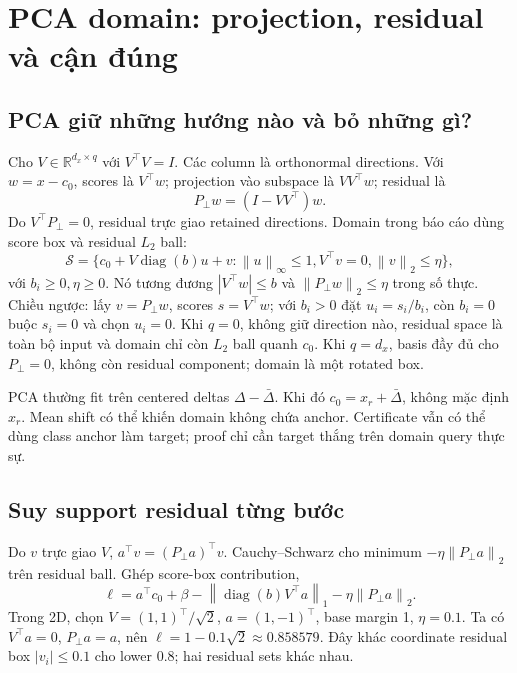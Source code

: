 \documentclass[11pt,a4paper]{article}
\newcommand{\R}{\mathbb R}
\newcommand{\norm}[1]{\left\lVert#1\right\rVert}
\newcommand{\diag}{\operatorname{diag}}
\newcommand{\Sset}{\mathcal S}
\theoremstyle{definition}
\begin{document}
\section{PCA domain: projection, residual và cận đúng}
\subsection{PCA giữ những hướng nào và bỏ những gì?}
Cho $V\in\R^{d_x\times q}$ với $V^\top V=I$. Các column là orthonormal
directions. Với $w=x-c_0$, scores là $V^\top w$; projection vào subspace
là $VV^\top w$; residual là
\begin{equation}
P_\perp w=(I-VV^\top)w.
\end{equation}
Do $V^\top P_\perp=0$, residual trực giao retained directions. Domain
trong báo cáo dùng score box và residual $L_2$ ball:
\begin{equation}
\Sset=\{c_0+V\diag(b)u+v:\norm{u}_\infty\le1,
V^\top v=0,\norm{v}_2\le\eta\},
\end{equation}
với $b_i\ge0,\eta\ge0$. Nó tương đương
$|V^\top w|\le b$ và $\norm{P_\perp w}_2\le\eta$ trong số thực. Chiều
ngược: lấy $v=P_\perp w$, scores $s=V^\top w$; với $b_i>0$ đặt
$u_i=s_i/b_i$, còn $b_i=0$ buộc $s_i=0$ và chọn $u_i=0$.
Khi $q=0$, không giữ direction nào, residual space là toàn bộ input và
domain chỉ còn $L_2$ ball quanh $c_0$. Khi $q=d_x$, basis đầy đủ cho
$P_\perp=0$, không còn residual component; domain là một rotated box.

PCA thường fit trên centered deltas $\Delta-\bar\Delta$. Khi đó
$c_0=x_r+\bar\Delta$, không mặc định $x_r$. Mean shift có thể khiến domain
không chứa anchor. Certificate vẫn có thể dùng class anchor làm target;
proof chỉ cần target thắng trên domain query thực sự.

\subsection{Suy support residual từng bước}
Do $v$ trực giao $V$, $a^\top v=(P_\perp a)^\top v$.
Cauchy--Schwarz cho minimum $-\eta\norm{P_\perp a}_2$ trên residual ball.
Ghép score-box contribution,
\begin{equation}
\ell=a^\top c_0+\beta
-\norm{\diag(b)V^\top a}_1-\eta\norm{P_\perp a}_2.
\end{equation}
Trong 2D, chọn $V=(1,1)^\top/\sqrt2$, $a=(1,-1)^\top$, base margin 1,
$\eta=0.1$. Ta có $V^\top a=0$, $P_\perp a=a$, nên
$\ell=1-0.1\sqrt2\approx0.858579$. Đây khác coordinate residual box
$|v_i|\le0.1$ cho lower 0.8; hai residual sets khác nhau.
\end{document}
